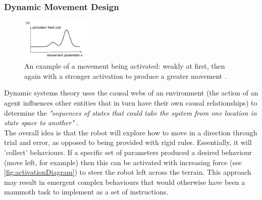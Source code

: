 \documentclass{article}
\begin{document}
\subsubsection{Dynamic Movement Design}
\label{sec:DST Aims}
\begin{figure}
    \centering
    \vspace*{-5mm}
    \includegraphics[width=0.3\textwidth]{activationExample}
    \caption{An example of a movement being activated: weakly at first, then again with a stronger activation to produce a greater movement \citep{dft}.}
    \label{fig:activationDiagram}
\end{figure}
Dynamic systems theory uses the causal webs of an environment (the action of an agent influences other entities that in turn have their own causal relationships) to determine the \textit{"sequences of states that could take the system from one location in state space to another"} .\\
The overall idea is that the robot will explore how to move in a direction through trial and error, as opposed to being provided with rigid rules. Essentially, it will 'collect' behaviours. If a specific set of parameters produced a desired behaviour (move left, for example) then this can be activated with increasing force (see \autoref{fig:activationDiagram}) to steer the robot left across the terrain. This approach may result in emergent complex behaviours that would otherwise have been a mammoth task to implement as a set of instructions. \\
\end{document}
